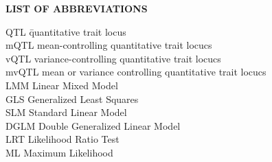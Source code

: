 {}

\begin{center}
{\Large \textbf{LIST OF ABBREVIATIONS}}
\end{center}

\newcommand{\Ab}[2]{\noindent  #1 \> #2 \\}
\newcommand{\Abi}[2]{\noindent #1 \hspace{1.5cm} \= #2 \\}

\begin{tabbing}
\Abi{QTL}{quantitative trait locus}
\Ab{mQTL}{mean-controlling quantitative trait locucs}
\Ab{vQTL}{variance-controlling quantitative trait locucs}
\Ab{mvQTL}{mean or variance controlling quantitative trait locucs}
\Ab{LMM}{Linear Mixed Model}
\Ab{GLS}{Generalized Least Squares}
\Ab{SLM}{Standard Linear Model}
\Ab{DGLM}{Double Generalized Linear Model}
\Ab{LRT}{Likelihood Ratio Test}
\Ab{ML}{Maximum Likelihood}
\end{tabbing}

\clearpage
